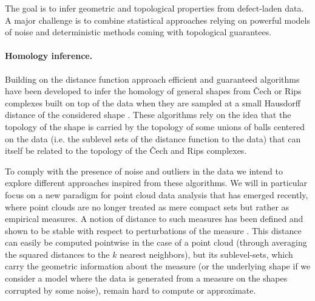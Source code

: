 

The goal is to infer geometric and topological properties from defect-laden data.
 A major challenge is to combine  statistical approaches relying on powerful models of noise and deterministic methods coming with topological guarantees.  



\paragraph{Homology inference.}
Building on the distance function approach efficient and guaranteed algorithms have been developed to infer the homology of general shapes from \v{C}ech or Rips complexes built on top of the data when they are sampled at a small Hausdorff distance of the considered shape \cite{co-tpr-2008}. These algorithms rely on the idea that the topology of the shape is carried by the topology of some unions of balls centered on the data (i.e. the sublevel sets of the distance function to the data) that can itself be related to the topology of the \v{C}ech and Rips complexes. 

To comply with the presence of noise and outliers in the data we intend to explore different approaches inspired from these algorithms.  We will in particular focus on a new paradigm for point cloud data analysis that has emerged recently, where point clouds are no longer treated as mere compact sets but rather as empirical measures. A notion of distance to such measures has been defined and shown to be stable with respect to perturbations of the measure \cite{ccsm-gipm-2011}. This distance can easily be computed pointwise in the case of a point cloud (through averaging the squared distances to the $k$ nearest neighbors), but its sublevel-sets, which carry the geometric information about the measure (or the underlying shape if we consider a model where the data is generated from a measure on the shapes corrupted by some noise), remain hard to compute or approximate.

